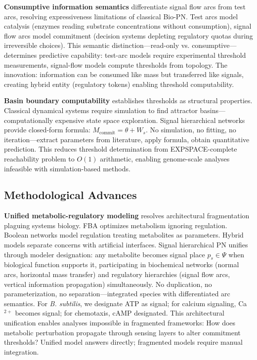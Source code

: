 \documentclass[10pt,letterpaper]{article}
\begin{document}
\textbf{Consumptive information semantics} differentiate signal flow arcs from test arcs, resolving expressiveness limitations of classical Bio-PN. Test arcs model catalysis (enzymes reading substrate concentrations without consumption), signal flow arcs model commitment (decision systems depleting regulatory quotas during irreversible choices). This semantic distinction---read-only vs. consumptive---determines predictive capability: test-arc models require experimental threshold measurements, signal-flow models compute thresholds from topology. The innovation: information can be consumed like mass but transferred like signals, creating hybrid entity (regulatory tokens) enabling threshold computability.

\textbf{Basin boundary computability} establishes thresholds as structural properties. Classical dynamical systems require simulation to find attractor basins---computationally expensive state space exploration. Signal hierarchical networks provide closed-form formula: $M_{\text{commit}} = \theta + W_s$. No simulation, no fitting, no iteration---extract parameters from literature, apply formula, obtain quantitative prediction. This reduces threshold determination from EXPSPACE-complete reachability problem to $O(1)$ arithmetic, enabling genome-scale analyses infeasible with simulation-based methods.

\subsection{Methodological Advances}

\textbf{Unified metabolic-regulatory modeling} resolves architectural fragmentation plaguing systems biology. FBA optimizes metabolism ignoring regulation. Boolean networks model regulation treating metabolites as parameters. Hybrid models separate concerns with artificial interfaces. Signal hierarchical PN unifies through modeler designation: any metabolite becomes signal place $p_s \in \Psi$ when biological function supports it, participating in biochemical networks (normal arcs, horizontal mass transfer) and regulatory hierarchies (signal flow arcs, vertical information propagation) simultaneously. No duplication, no parameterization, no separation---integrated species with differentiated arc semantics. For \textit{B. subtilis}, we designate ATP as signal; for calcium signaling, Ca$^{2+}$ becomes signal; for chemotaxis, cAMP designated. This architectural unification enables analyses impossible in fragmented frameworks: How does metabolic perturbation propagate through sensing layers to alter commitment thresholds? Unified model answers directly; fragmented models require manual integration.
\end{document}
